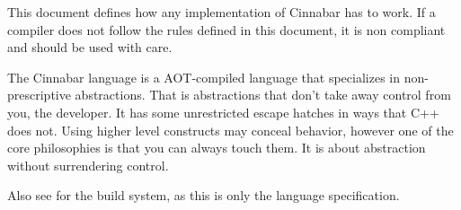 

\introduction
\para This document defines how any implementation of Cinnabar has to work. If a compiler does not follow the rules defined in this document, it is non compliant and should be used with care.

\para The Cinnabar language is a AOT-compiled language that specializes in non-prescriptive abstractions. That is abstractions that don't take away control from you, the developer. It has some unrestricted escape hatches in ways that C++ does not. Using higher level constructs may conceal behavior, however one of the core philosophies is that you can always touch them. It is about abstraction without surrendering control.


\para Also see \crucible for the build system, as this is only the language specification.
\tableofcontents
